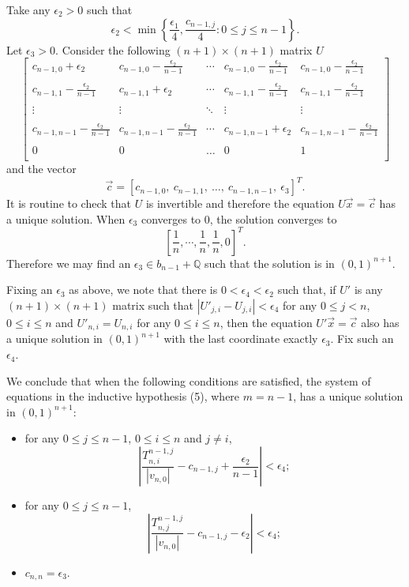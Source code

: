 \documentclass{amsart}
\theoremstyle{definition}
\theoremstyle{problem}
\theoremstyle{remark}
\numberwithin{equation}{section}
\begin{document}
Take any $\epsilon_2>0$ such that 
$$\epsilon_2<\min\left\{\frac{\epsilon_1}{4}, \frac{c_{n-1,j}}{4}: 0\le j\le n-1\right\}. $$
Let $\epsilon_3>0$. 
Consider the following $(n+1)\times (n+1)$ matrix $U$
$$
\begin{bmatrix}
c_{n-1,0}+\epsilon_2 &c_{n-1,0}-\displaystyle\frac{\epsilon_2 }{n-1} &\cdots&c_{n-1,0}-\displaystyle\frac{\epsilon_2 }{n-1}&c_{n-1,0}-\displaystyle\frac{\epsilon_2 }{n-1}\\ \\
c_{n-1,1}-\displaystyle\frac{\epsilon_2 }{n-1}&c_{n-1,1}+\epsilon_2 &\cdots&c_{n-1,1}-\displaystyle\frac{\epsilon_2 }{n-1}&c_{n-1,1}-\displaystyle\frac{\epsilon_2 }{n-1}\\ \\
\vdots&\vdots&\ddots&\vdots&\vdots\\ \\
c_{n-1,n-1}-\displaystyle\frac{\epsilon_2 }{n-1}&c_{n-1,n-1}-\displaystyle\frac{\epsilon_2 }{n-1}&\cdots&c_{n-1,n-1}+\epsilon_2&c_{n-1,n-1}-\displaystyle\frac{\epsilon_2 }{n-1}\\ \\
0&0&\dots&0&1\\
\end{bmatrix}
$$
and the vector 
$$\vec{c}=[c_{n-1,0},\ c_{n-1,1},\ \dots,\ c_{n-1,n-1},\ \epsilon_3]^T.$$
It is routine to check that $U$ is invertible and therefore the equation $U\vec{x}=\vec{c}$ has a unique solution.
When $\epsilon_3$ converges to $0$, the solution converges to 
$$\left[\frac{1}{n},\cdots,\frac{1}{n},\frac{1}{n},0\right]^T. $$
Therefore we may find an $\epsilon_3 \in b_{n-1} +\mathbb Q$ such that  the solution is in $(0,1)^{n+1}$.


Fixing an $\epsilon_3$ as above, we note that there is $0<\epsilon_4<\epsilon_2$ such that,  if $U'$ is any $(n+1)\times (n+1)$ matrix such that $|U'_{j,i}-U_{j,i}|<\epsilon_4$ for any $0\le j<n$, $0\le i \le n$ and $U'_{n,i}=U_{n,i}$ for any $0\le i\le  n$, then the equation $U'\vec{x}=\vec{c}$ also has a unique solution in $(0,1)^{n+1}$ with the last coordinate exactly $\epsilon_3$. Fix such an $\epsilon_4$.

We conclude that when the  following conditions are satisfied, the system of equations in the inductive hypothesis (5), where $m=n-1$, has a unique solution in $(0,1)^{n+1}$:
\begin{itemize}

\item   for any $0\le j\le n-1$, $0\le i\le n$ and $j\neq i$, 
$$\left|\frac{T^{n-1,j}_{n,i}}{|v_{n,0}|}-c_{n-1,j}+\frac{\epsilon_2}{n-1} \right|<\epsilon_4;$$
\item  for any $0\le j\le n-1$,
$$\left|\frac{T^{n-1,j}_{n,j}}{|v_{n,0}|}-c_{n-1,j}-\epsilon_2 \right|<\epsilon_4;$$
\item $c_{n,n}=\epsilon_3$.
\end{itemize}
\end{document}
